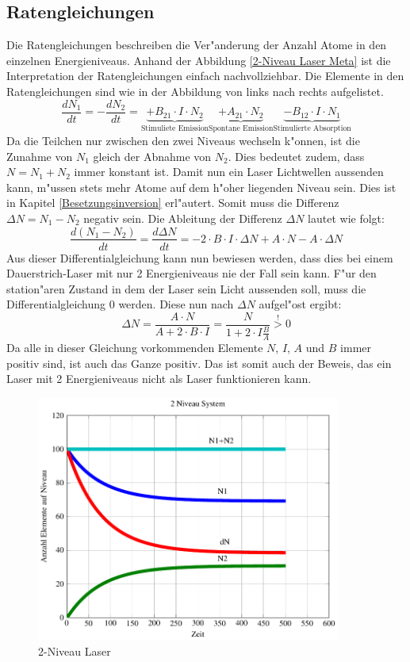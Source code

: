 \begin{refsection}
\subsection{Ratengleichungen}
\label{2-Niveau Ratengleichungen}
Die Ratengleichungen beschreiben die Ver"anderung der Anzahl Atome in den
einzelnen Energieniveaus.
Anhand der Abbildung \ref{2-Niveau Laser Meta} ist die Interpretation der
Ratengleichungen einfach nachvollziehbar.
Die Elemente in den Ratengleichungen sind wie in der Abbildung von links
nach rechts aufgelistet.
\[ \frac{dN_1}{dt} = -\frac{dN_2}{dt} = 
\underbrace{+ B_{21} \cdot  I \cdot N_2}_{\text{Stimuliete~Emission}}
\underbrace{+ A_{21}\cdot N_2}_{\text{Spontane~Emission}}
\underbrace{-B_{12} \cdot I \cdot N_1}_{\text{Stimulierte~Absorption}}\]
Da die Teilchen nur zwischen den zwei Niveaus wechseln k"onnen, ist die Zunahme
von $N_1$ gleich der Abnahme von $N_2$. 
Dies bedeutet zudem, dass $N = N_1 + N_2 $ immer konstant ist.
Damit nun ein Laser Lichtwellen aussenden kann, m"ussen stets mehr Atome auf
dem h"oher liegenden Niveau sein.
Dies ist in Kapitel \ref{Besetzungsinversion} erl"autert.
Somit muss die Differenz $\Delta N = N_1 - N_2$ negativ sein.
Die Ableitung der Differenz $\Delta N$ lautet wie folgt:
\[ \frac{d(N_1 - N_2)}{dt} = \frac{d \Delta N}{dt} = -2\cdot B\cdot I\cdot
\Delta N + A\cdot N - A\cdot \Delta N \]
Aus dieser Differentialgleichung kann nun bewiesen werden, dass dies bei einem
Dauerstrich-Laser mit nur 2 Energieniveaus nie der Fall sein kann. 
F"ur den station"aren Zustand in dem der Laser sein Licht aussenden soll, muss
die Differentialgleichung 0 werden.
Diese nun nach $\Delta N$ aufgel"ost ergibt:
\[ \Delta N = \frac{A\cdot N}{A+2\cdot B\cdot I} = \frac{N}{1+2\cdot I 
\frac{B}{A}} \stackrel{!}{>} 0\]
Da alle in dieser Gleichung vorkommenden Elemente $N$, $I$, $A$ und $B$ immer positiv
sind, ist auch das Ganze positiv.
Das ist somit auch der Beweis, das ein Laser mit 2 Energieniveaus nicht als
Laser funktionieren kann.
\begin{figure}
\centering
\includegraphics[width = 10cm]{laser/bilder/2_niveau.pdf}
\caption{2-Niveau Laser}
\label{2-Niveau Laser}
\end{figure}


\end{refsection}
